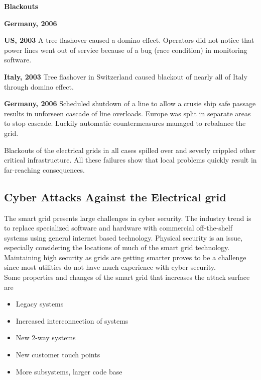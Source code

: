 \begin{tcolorbox}
    \textbf{Blackouts}
    \begin{labeling}{\textbf{Germany, 2006}}
    \item [\textbf{US, 2003}]
        A tree flashover caused a domino effect.
        Operators did not notice that power lines went out of service because of a bug (race condition) in monitoring software.
    \item [\textbf{Italy, 2003}]
        Tree flashover in Switzerland caused blackout of nearly all of Italy through domino effect.
    \item [\textbf{Germany, 2006}]
    Scheduled shutdown of a line to allow a crusie ship safe passage results in unforseen cascade of line overloads.
        Europe was split in separate areas to stop cascade.
        Luckily automatic countermeasures managed to rebalance the grid.
    \end{labeling}

Blackouts of the electrical grids in all cases spilled over and severly crippled other critical infrastructure.
All these failures show that local problems quickly result in far-reaching consequences.
\end{tcolorbox}

\subsection{Cyber Attacks Against the Electrical grid}
The smart grid presents large challenges in cyber security.
The industry trend is to replace specialized software and hardware with commercial off-the-shelf systems using general internet based technology.
Physical security is an issue, especially considering the locations of much of the smart grid technology.
Maintaining high security as grids are getting smarter proves to be a challenge since most utilities do not have much experience with cyber security.\\

Some properties and changes of the smart grid that increases the attack surface are
\begin{itemize}
    \item Legacy systems
    \item Increased interconnection of systems
    \item New 2-way systems
    \item New customer touch points
    \item More subsystems, larger code base
\end{itemize}

